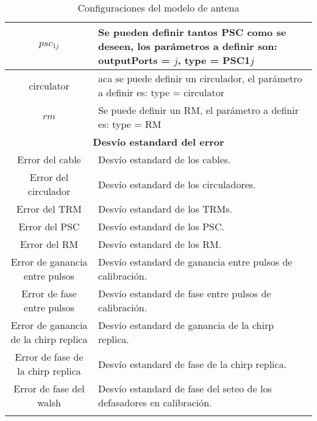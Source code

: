 \begin{center}
\begin{longtable}{|c|p{9cm}|}
	$psc_{1j}$ & Se pueden definir tantos PSC como se deseen, los parámetros a definir son: outputPorts = $j$, type = PSC1$j$ \tabularnewline \hline 
	circulator & aca se puede definir un circulador, el parámetro a definir es: type = circulator \tabularnewline \hline 
	$rm$ & Se puede definir un RM, el parámetro a definir es: type = RM \tabularnewline \hline 
	\multicolumn{2}{|c|}{\textbf{Desvío estandard del error}} \\
	\hline
	Error del cable & Desvío estandard de los cables. \tabularnewline \hline 
	Error del circulador & Desvío estandard de los circuladores. \tabularnewline \hline 
	Error del TRM & Desvío estandard de los TRMs. \tabularnewline \hline 
	Error del PSC & Desvío estandard de los PSC. \tabularnewline \hline 
	Error del RM & Desvío estandard de los RM. \tabularnewline \hline 
	Error de ganancia entre pulsos & Desvío estandard de ganancia entre pulsos de calibración. \tabularnewline \hline 
	Error de fase entre pulsos & Desvío estandard de fase entre pulsos de calibración. \tabularnewline \hline 
	Error de ganancia de la chirp replica & Desvío estandard de ganancia de la chirp replica. \tabularnewline \hline 
	Error de fase de la chirp replica & Desvío estandard de fase de la chirp replica. \tabularnewline \hline 
	Error de fase del walsh & Desvío estandard de fase del seteo de los defasadores en calibración. \tabularnewline \hline 
	\caption{Configuraciones del modelo de antena}
  \end{longtable}
  \label{tab:conf_modelo_antena}
\end{center}

